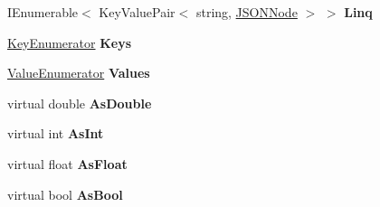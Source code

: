 \begin{DoxyCompactItemize}
\item 
I\+Enumerable$<$ Key\+Value\+Pair$<$ string, \hyperlink{classSimpleJSON_1_1JSONNode}{J\+S\+O\+N\+Node} $>$ $>$ {\bfseries Linq}\hypertarget{classSimpleJSON_1_1JSONNode_a48a8098eef6d86fce5520ec16f49c934}{}\label{classSimpleJSON_1_1JSONNode_a48a8098eef6d86fce5520ec16f49c934}

\item 
\hyperlink{structSimpleJSON_1_1JSONNode_1_1KeyEnumerator}{Key\+Enumerator} {\bfseries Keys}\hypertarget{classSimpleJSON_1_1JSONNode_a81eba64175e309a73930e4cbef5c0415}{}\label{classSimpleJSON_1_1JSONNode_a81eba64175e309a73930e4cbef5c0415}

\item 
\hyperlink{structSimpleJSON_1_1JSONNode_1_1ValueEnumerator}{Value\+Enumerator} {\bfseries Values}\hypertarget{classSimpleJSON_1_1JSONNode_a2aa2fd8fe02cf6a0ba83a34210a31f04}{}\label{classSimpleJSON_1_1JSONNode_a2aa2fd8fe02cf6a0ba83a34210a31f04}

\item 
virtual double {\bfseries As\+Double}\hypertarget{classSimpleJSON_1_1JSONNode_ad9364dff62c04c6fc46cc50981c44941}{}\label{classSimpleJSON_1_1JSONNode_ad9364dff62c04c6fc46cc50981c44941}

\item 
virtual int {\bfseries As\+Int}\hypertarget{classSimpleJSON_1_1JSONNode_a1e771cb19c2928bcea2ad18f96021610}{}\label{classSimpleJSON_1_1JSONNode_a1e771cb19c2928bcea2ad18f96021610}

\item 
virtual float {\bfseries As\+Float}\hypertarget{classSimpleJSON_1_1JSONNode_a78fd9e2a7fb6a99a4f9b106f793e7686}{}\label{classSimpleJSON_1_1JSONNode_a78fd9e2a7fb6a99a4f9b106f793e7686}

\item 
virtual bool {\bfseries As\+Bool}\hypertarget{classSimpleJSON_1_1JSONNode_a6bf6982e6220db3f9360a2fc3b53aa14}{}\label{classSimpleJSON_1_1JSONNode_a6bf6982e6220db3f9360a2fc3b53aa14}


\end{DoxyCompactItemize}
